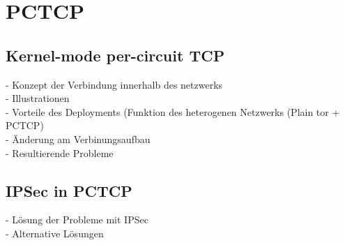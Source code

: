 \section{PCTCP}

\subsection{Kernel-mode per-circuit TCP}

- Konzept der Verbindung innerhalb des netzwerks\\
- Illustrationen\\
- Vorteile des Deployments (Funktion des heterogenen Netzwerks (Plain tor + PCTCP)\\
- Änderung am Verbinungsaufbau\\
- Resultierende Probleme\\

\subsection{IPSec in PCTCP}

- Lösung der Probleme mit IPSec\\
- Alternative Lösungen
